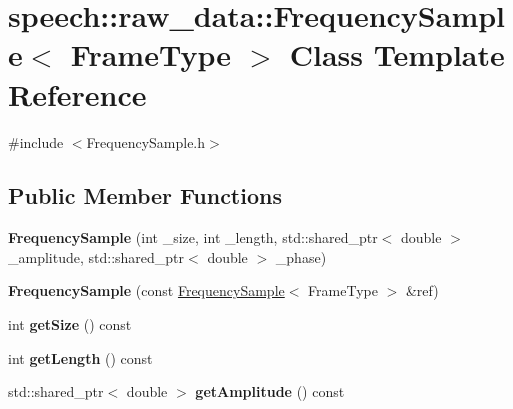 \hypertarget{classspeech_1_1raw__data_1_1FrequencySample}{\section{speech\+:\+:raw\+\_\+data\+:\+:Frequency\+Sample$<$ Frame\+Type $>$ Class Template Reference}
\label{classspeech_1_1raw__data_1_1FrequencySample}
}


{\ttfamily \#include $<$Frequency\+Sample.\+h$>$}

\subsection*{Public Member Functions}
\begin{DoxyCompactItemize}
\item 
\hypertarget{classspeech_1_1raw__data_1_1FrequencySample_a1f4ca7110fb15631892591983b216356}{{\bfseries Frequency\+Sample} (int \+\_\+size, int \+\_\+length, std\+::shared\+\_\+ptr$<$ double $>$ \+\_\+amplitude, std\+::shared\+\_\+ptr$<$ double $>$ \+\_\+phase)}\label{classspeech_1_1raw__data_1_1FrequencySample_a1f4ca7110fb15631892591983b216356}

\item 
\hypertarget{classspeech_1_1raw__data_1_1FrequencySample_aa2808ab18bc12f6d56e83f8d9b4579fe}{{\bfseries Frequency\+Sample} (const \hyperlink{classspeech_1_1raw__data_1_1FrequencySample}{Frequency\+Sample}$<$ Frame\+Type $>$ \&ref)}\label{classspeech_1_1raw__data_1_1FrequencySample_aa2808ab18bc12f6d56e83f8d9b4579fe}

\item 
\hypertarget{classspeech_1_1raw__data_1_1FrequencySample_acd9c100333a574ebf20042c45530d38d}{int {\bfseries get\+Size} () const }\label{classspeech_1_1raw__data_1_1FrequencySample_acd9c100333a574ebf20042c45530d38d}

\item 
\hypertarget{classspeech_1_1raw__data_1_1FrequencySample_a91b96f3be3eab9a2346644eae33389ab}{int {\bfseries get\+Length} () const }\label{classspeech_1_1raw__data_1_1FrequencySample_a91b96f3be3eab9a2346644eae33389ab}

\item 
\hypertarget{classspeech_1_1raw__data_1_1FrequencySample_aa897889f1daf35bbb2ef437f3b0fcca2}{std\+::shared\+\_\+ptr$<$ double $>$ {\bfseries get\+Amplitude} () const }\label{classspeech_1_1raw__data_1_1FrequencySample_aa897889f1daf35bbb2ef437f3b0fcca2}


\end{DoxyCompactItemize}
